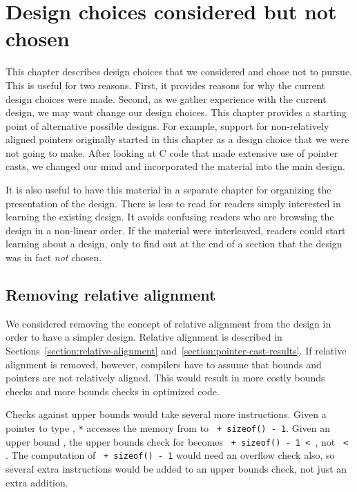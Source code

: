 
\chapter{Design choices considered but not chosen}
\label{chapter:design-alternatives}

This chapter describes design choices that we considered and chose not to pursue.
This is useful for two reasons.  First, it provides reasons for why the current
design choices were made.  Second, as we gather experience with the current
design, we may want change  our design choices.  This chapter provides a starting point
of alternative possible designs.  For example, support for non-relatively 
aligned pointers originally started in this chapter as a design choice that
we were not going to make.  After looking at C code that
made extensive use of pointer casts, we changed our mind and incorporated
the material into the main design.

It is also useful to have this material in a separate chapter for organizing
the presentation of the design.  There is less to read for readers simply
interested in learning the existing design.  It avoids confusing
readers who are browsing the design in a non-linear order.   If the material
were interleaved, readers could start learning about a design, only to find
out at the end of a section that the design was in fact {\em not} chosen.
 
\section{Removing relative alignment}
\label{section:design-alternatives:always-unaligned}

We considered removing the concept of relative alignment from the design in order
to have a simpler design. 
Relative alignment is described in Sections~\ref{section:relative-alignment}
and~\ref{section:pointer-cast-results}.  If relative alignment
is removed, however, compilers have to assume that bounds and pointers are
not relatively aligned.   This would result in more costly bounds checks and
more bounds checks in optimized code.

Checks against upper bounds would  take several more instructions.
Given a pointer  to type , \texttt{*} accesses the memory from
 to \texttt{ + sizeof() - 1}. Given an upper bound , the
upper bounds check for  becomes \texttt{ + sizeof() - 1 < },
not \texttt{ < }.  The
computation of \texttt{ + sizeof() - 1} would need an overflow check also, 
so several extra instructions would be added to an upper bounds check, 
not just an extra addition.

